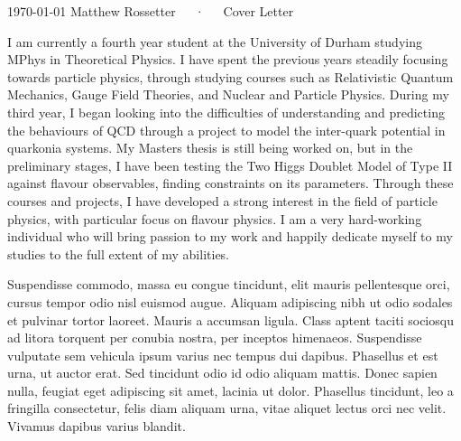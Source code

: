 \documentclass[11pt, a4paper]{awesome-cv}
\begin{document}
\makecvheader[R]

\makecvfooter
  {\today}
  {Matthew Rossetter~~~·~~~Cover Letter}
  {}

\makelettertitle

\begin{cvletter}

I am currently a fourth year student at the University of Durham studying MPhys in Theoretical Physics. 
I have spent the previous years steadily focusing towards particle physics, through studying courses such as Relativistic Quantum Mechanics, Gauge Field Theories, and Nuclear and Particle Physics. 
During my third year, I began looking into the difficulties of understanding and predicting the behaviours of QCD through a project to model the inter-quark potential in quarkonia systems.
My Masters thesis is still being worked on, but in the preliminary stages, I have been testing the Two Higgs Doublet Model of Type II against flavour observables, finding constraints on its parameters. 
Through these courses and projects, I have developed a strong interest in the field of particle physics, with particular focus on flavour physics. 
I am a very hard-working individual who will bring passion to my work and happily dedicate myself to my studies to the full extent of my abilities. 


Suspendisse commodo, massa eu congue tincidunt, elit mauris pellentesque orci, cursus tempor odio nisl euismod augue. Aliquam adipiscing nibh ut odio sodales et pulvinar tortor laoreet. Mauris a accumsan ligula. Class aptent taciti sociosqu ad litora torquent per conubia nostra, per inceptos himenaeos. Suspendisse vulputate sem vehicula ipsum varius nec tempus dui dapibus. Phasellus et est urna, ut auctor erat. Sed tincidunt odio id odio aliquam mattis. Donec sapien nulla, feugiat eget adipiscing sit amet, lacinia ut dolor. Phasellus tincidunt, leo a fringilla consectetur, felis diam aliquam urna, vitae aliquet lectus orci nec velit. Vivamus dapibus varius blandit.


\end{cvletter}
\end{document}
